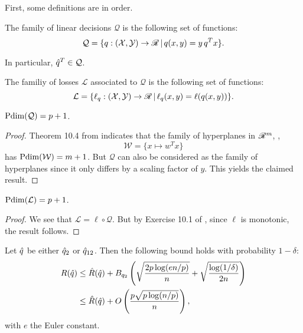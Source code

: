 \documentclass{article}
\begin{document}
First, some definitions are in order.

\begin{definition}
  The family of linear decisions $\mathcal{Q}$ is the following set of functions:
  \[
    \mathcal{Q} = \{q:(\mathcal{X},\mathcal{Y})\to\mathscr{R}\,|\,q(x,y) = y\,q^Tx\}.
  \]
\end{definition}

\begin{rem}
  In particular, $\hat q^T\in\mathcal{Q}$. 
\end{rem}

\begin{definition}
  The familiy of losses $\mathcal{L}$ associated to $\mathcal{Q}$ is the following set of
  functions:
  \[
    \mathcal{L} = \{\ell_q:(\mathcal{X},\mathcal{Y})\to \mathscr{R}\,|\,\ell_q(x,y) = \ell(q(x,y))\}.
  \]
\end{definition}

\begin{prop}
  $\operatorname{Pdim}(\mathcal{Q}) = p+1$.
\end{prop}
\begin{proof}
  Theorem 10.4 from \cite{mohri2012foundations} indicates that the family of hyperplanes
  in $\mathscr{R}^m$, \ie,
  \[
     \mathcal{W} = \{x\mapsto w^Tx\}
   \]
   has $\operatorname{Pdim}(\mathcal{W}) = m+1$. But $\mathcal{Q}$ can also be considered as the family
   of hyperplanes since it only differs by a scaling factor of $y$. This yields the
   claimed result.
\end{proof}

\begin{prop}
  $\operatorname{Pdim}(\mathcal{L}) = p+1$.
\end{prop}
\begin{proof}
  We see that $\mathcal{L} = \ell \circ \mathcal{Q}$. But by Exercise 10.1 of
  \cite{mohri2012foundations}, since $\ell$ is monotonic, the result follows. 
\end{proof}

\begin{thm}
  \label{thm1}
  Let $\hat q$ be either $\hat q_2$ or $\hat q_{12}$. Then the following bound holds with
  probability  $1-\delta$:
  \begin{align*}
    R(\hat q) &\leq \hat R(\hat q) + B_{q_2}\left(\sqrt{\frac{2p\log(en/p)}{n}} +
                \sqrt{\frac{\log(1/\delta)}{2n}}\right)\\
    &\leq \hat R(\hat q) + O\left(\frac{p\sqrt{p\log(n/p)}}{n}\right),
  \end{align*}
  with $e$ the Euler constant. 
\end{thm}
\end{document}
